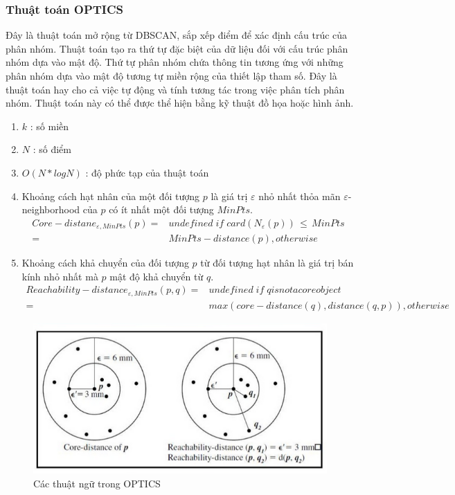 \subsubsection{Thuật toán OPTICS}
\hspace{10mm}Đây là thuật toán mở rộng từ DBSCAN, sắp xếp điểm để xác định cấu trúc của phân nhóm. Thuật toán tạo ra thứ tự đặc biệt của dữ liệu đối với cấu trúc phân nhóm dựa vào mật độ. Thứ tự phân nhóm chứa thông tin tương ứng với những phân nhóm dựa vào mật độ tương tự miền rộng của thiết lập tham số. Đây là thuật toán hay cho cả việc tự động và tính tương tác trong việc phân tích phân nhóm. Thuật toán này có thể được thể hiện bằng kỹ thuật đồ họa hoặc hình ảnh.\\
\begin{enumerate}
\vspace{-10mm}
\item[]$k$ : số miền
\item[]$N$ : số điểm
\item[]$O(N*logN)$ : độ phức tạp của thuật toán
\item[]Khoảng cách hạt nhân của một đối tượng $p$ là giá trị $\varepsilon$ nhỏ nhất thỏa mãn $\varepsilon$-neighborhood của $p$ có ít nhất một đối tượng $MinPts$.
\begin{align*}
Core-distane_{\varepsilon, MinPts}(p) =& undefined\; if\; card(N_\varepsilon(p))\,\leq\, MinPts \\
=& MinPts-distance(p), otherwise
\end{align*}
\item[]Khoảng cách khả chuyển của đối tượng $p$ từ đối tượng hạt nhân là giá trị bán kính nhỏ nhất mà $p$ mật độ khả chuyển từ $q$.
\begin{align*}
Reachability-distance_{\varepsilon, MinPts}(p,q) =& undefined\; if\; q is not a core object \\
=& max(core-distance(q), distance(q,p)), otherwise
\end{align*}
\end{enumerate}

\begin{figure}[htp]
\centering
\includegraphics{Images/Optics_01}
\caption{Các thuật ngữ trong OPTICS}
\label{fig:Optics_01}
\end{figure}


